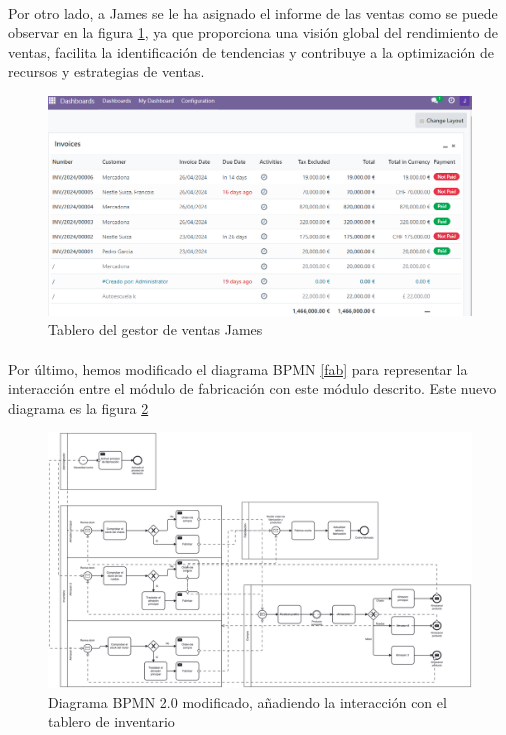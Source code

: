 \paragraph{}
Por otro lado, a James se le ha asignado el informe de las ventas como se puede observar en la figura \ref{fig:james}, ya que proporciona una visión global del rendimiento de ventas, facilita la identificación de tendencias y contribuye a la optimización de recursos y estrategias de ventas.
\newpage
\begin{figure}[h]
    \centering
    \includegraphics[width=1\linewidth]{fotosDecisiones/james.png}
    \caption{Tablero del gestor de ventas James}
    \label{fig:james}
\end{figure}
\paragraph{}
Por último, hemos modificado el diagrama BPMN \ref{fab} para representar la interacción entre el módulo de fabricación con este módulo descrito. Este nuevo diagrama es la figura \ref{bi}

\begin{figure}[h]
    \centering
    \includegraphics[width=1\linewidth]{fotosGestFab/BI.png}
    \caption{Diagrama BPMN 2.0 modificado, añadiendo la interacción con el tablero de inventario}
    \label{bi}
\end{figure}
\newpage
